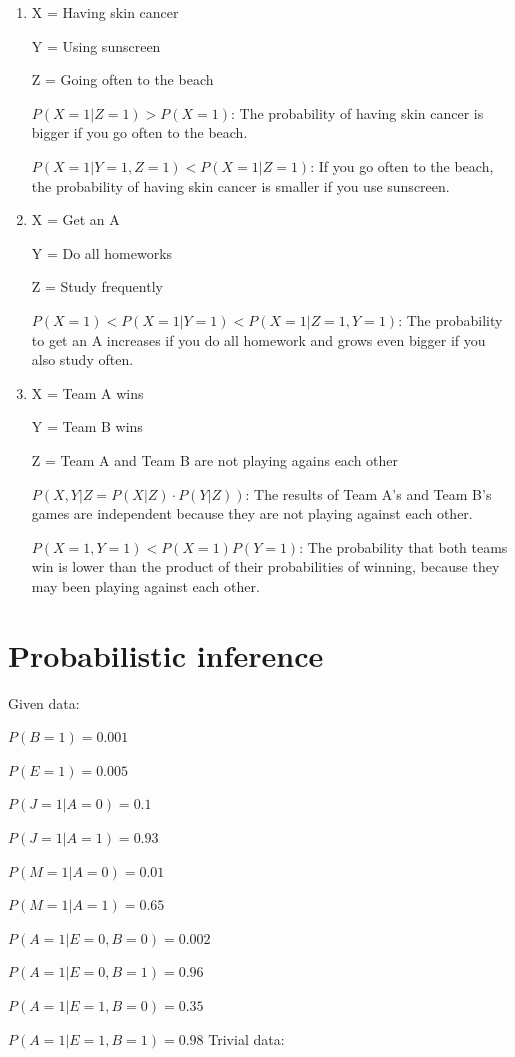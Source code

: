 \documentclass{article}
\begin{document}
\begin{enumerate}[label=(\alph*)]
\item
X = Having skin cancer

Y = Using sunscreen

Z = Going often to the beach

$P(X=1|Z=1)>P(X=1)$: The probability of having skin cancer is bigger if you go often to the beach.

$P(X=1|Y=1,Z=1)<P(X=1|Z=1)$: If you go often to the beach, the probability of having skin cancer is smaller if you use sunscreen.

\item
X = Get an A

Y = Do all homeworks

Z = Study frequently

$P(X=1) < P(X=1|Y=1) < P(X=1|Z=1,Y=1)$: The probability to get an A increases if you do all homework and grows even bigger if you also study often.

\item 
X = Team A wins

Y = Team B wins

Z = Team A and Team B are not playing agains each other

$P(X,Y|Z = P(X|Z) \cdot P(Y|Z))$: The results of Team A's and Team B's games are independent because they are not playing against each other.

$P(X=1,Y=1)<P(X=1)P(Y=1)$: The probability that both teams win is lower than the product of their probabilities of winning, because they may been playing against each other.
\end{enumerate}

\section{Probabilistic inference}

Given data:

$P(B=1)=0.001$

$P(E=1)=0.005$

$P(J=1|A=0)=0.1$

$P(J=1|A=1)=0.93$

$P(M=1|A=0)=0.01$

$P(M=1|A=1)=0.65$

$P(A=1|E=0,B=0)=0.002$

$P(A=1|E=0,B=1)=0.96$

$P(A=1|E=1,B=0)=0.35$

$P(A=1|E=1,B=1)=0.98$
\bigbreak
Trivial data:
\end{document}

